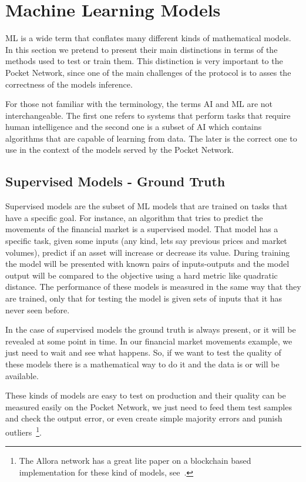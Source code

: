 \section{Machine Learning Models}\label{sec:b}

\Gls{ML} is a wide term that conflates many different kinds of mathematical models. In this section we pretend to present their main distinctions in terms of the methods used to test or train them. This distinction is very important to the Pocket Network, since one of the main challenges of the protocol is to asses the correctness of the models inference. 

For those not familiar with the terminology, the terms \gls{AI} and \gls{ML} are not interchangeable. The first one refers to systems that perform tasks that require human intelligence and the second one is a subset of \gls{AI} which contains algorithms that are capable of learning from data. The later is the correct one to use in the context of the models served by the Pocket Network.

\subsection{Supervised Models - Ground Truth}
Supervised models are the subset of \gls{ML} models that are trained on tasks that have a specific goal. For instance, an algorithm that tries to predict the movements of the financial market is a supervised model. That model has a specific task, given some inputs (any kind, lets say previous prices and market volumes), predict if an asset will increase or decrease its value. During training the model will be presented with known pairs of inputs-outputs and the model output will be compared to the objective using a hard metric like quadratic distance.
The performance of these models is measured in the same way that they are trained, only that for testing the model is given sets of inputs that it has never seen before.

In the case of supervised models the ground truth is always present, or it will be revealed at some point in time. In our financial market movements example, we just need to wait and see what happens. So, if we want to test the quality of these models there is a mathematical way to do it and the data is or will be available. 

These kinds of models are easy to test on production and their quality can be measured easily on the Pocket Network, we just need to feed them test samples and check the output error, or even create simple majority errors and punish outliers~\footnote{The Allora network has a great lite paper on a blockchain based implementation for these kind of models, see~\cite{allora_litepaper}. }.

